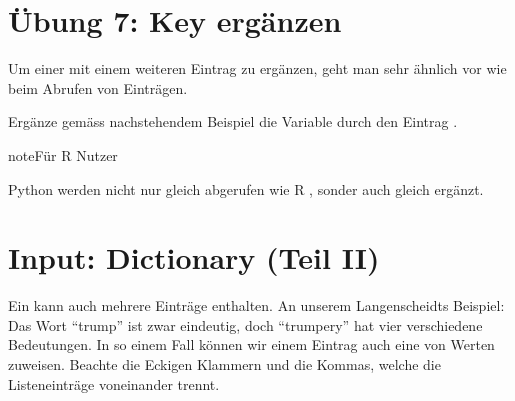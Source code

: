 \documentclass[letterpaper,10pt,english]{sphinxmanual}
\begin{document}
\section{Übung 7: Key ergänzen}
\label{\detokenize{01_02_Python_Basics:ubung-7-key-erganzen}}
Um einer  mit einem weiteren Eintrag zu ergänzen, geht man sehr ähnlich vor wie beim Abrufen von Einträgen.

\begin{sphinxVerbatim}[commandchars=\\\{\}]
\PYG{p}{[}\PYG{p}{]}   
\end{sphinxVerbatim}

Ergänze gemäss nachstehendem Beispiel die Variable  durch den Eintrag .

\begin{sphinxadmonition}{note}{Für R Nutzer}

Python  werden nicht nur gleich abgerufen wie R , sonder auch gleich ergänzt.
\end{sphinxadmonition}

\begin{sphinxVerbatim}[commandchars=\\\{\}]
\PYG{p}{[}\PYG{p}{]}  
\end{sphinxVerbatim}


\section{Input: Dictionary (Teil II)}
\label{\detokenize{01_02_Python_Basics:input-dictionary-teil-ii}}
Ein  kann auch mehrere Einträge enthalten. An unserem Langenscheidts Beispiel: Das Wort “trump” ist zwar eindeutig, doch “trumpery” hat vier verschiedene Bedeutungen. In so einem Fall können wir einem Eintrag auch eine  von Werten zuweisen. Beachte die Eckigen Klammern und die Kommas, welche die Listeneinträge voneinander trennt.

\begin{sphinxVerbatim}[commandchars=\\\{\}]
\PYG{p}{[}\PYG{p}{]}  \PYG{p}{[}   \PYG{p}{]}    
\PYG{p}{[}\PYG{p}{]}
\end{sphinxVerbatim}
\end{document}
